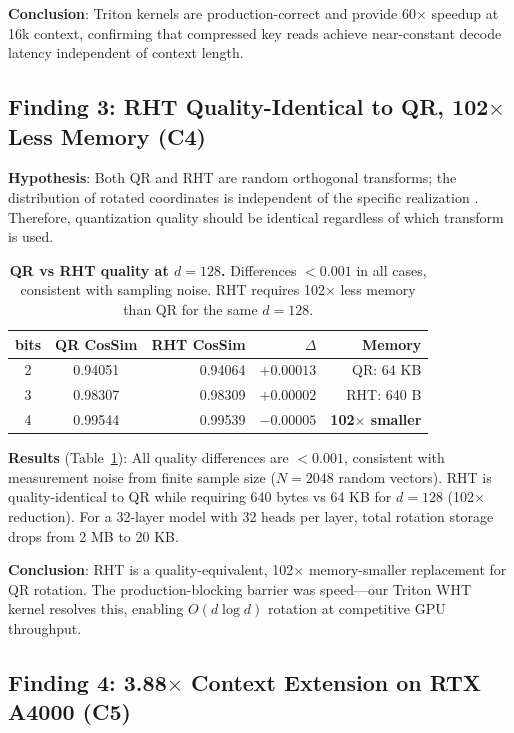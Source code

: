 \documentclass{article}
\begin{document}
\textbf{Conclusion}: Triton kernels are production-correct and provide 60$\times$ speedup at 16k context, confirming that compressed key reads achieve near-constant decode latency independent of context length.

\subsection{Finding 3: RHT Quality-Identical to QR, 102$\times$ Less Memory (C4)}

\textbf{Hypothesis}: Both QR and RHT are random orthogonal transforms; the distribution of rotated coordinates is independent of the specific realization \citep{ailon2009fast}. Therefore, quantization quality should be identical regardless of which transform is used.

\begin{table}[h]
\centering
\caption{\textbf{QR vs RHT quality at $d=128$.} Differences $<0.001$ in all cases, consistent with sampling noise. RHT requires 102$\times$ less memory than QR for the same $d=128$.}
\label{tab:rht}
\begin{tabular}{ccrrr}
\toprule
\textbf{bits} & \textbf{QR CosSim} & \textbf{RHT CosSim} & \textbf{$\Delta$} & \textbf{Memory} \\
\midrule
2 & 0.94051 & 0.94064 & $+0.00013$ & QR: 64 KB \\
3 & 0.98307 & 0.98309 & $+0.00002$ & RHT: 640 B \\
4 & 0.99544 & 0.99539 & $-0.00005$ & \textbf{102$\times$ smaller} \\
\bottomrule
\end{tabular}
\end{table}

\textbf{Results} (Table~\ref{tab:rht}): All quality differences are $<0.001$, consistent with measurement noise from finite sample size ($N=2048$ random vectors). RHT is quality-identical to QR while requiring 640 bytes vs 64 KB for $d=128$ (102$\times$ reduction). For a 32-layer model with 32 heads per layer, total rotation storage drops from 2 MB to 20 KB.

\textbf{Conclusion}: RHT is a quality-equivalent, 102$\times$ memory-smaller replacement for QR rotation. The production-blocking barrier was speed—our Triton WHT kernel resolves this, enabling $O(d \log d)$ rotation at competitive GPU throughput.

\subsection{Finding 4: 3.88$\times$ Context Extension on RTX A4000 (C5)}
\end{document}
